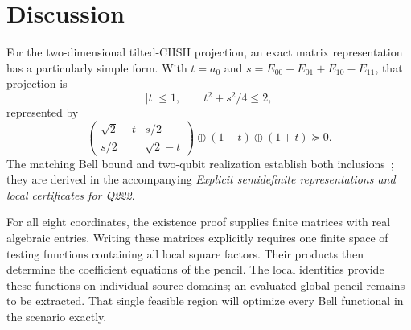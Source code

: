 \documentclass[11pt,a4paper]{article}
\theoremstyle{definition}
\begin{document}

\section{Discussion}

For the two-dimensional tilted-CHSH projection, an exact matrix
representation has a particularly simple form. With $t=a_0$ and
$s=E_{00}+E_{01}+E_{10}-E_{11}$, that projection is
\[
 |t|\le1,\qquad t^2+s^2/4\le2,
\]
represented by
\[
 \begin{pmatrix}\sqrt2+t&s/2\\s/2&\sqrt2-t\end{pmatrix}
 \oplus(1-t)\oplus(1+t)\succeq0.
\]
The matching Bell bound and two-qubit realization establish both
inclusions~\cite{BampsPironio}; they are derived in the accompanying
\emph{Explicit semidefinite representations and local certificates for Q222}.

For all eight coordinates, the existence proof supplies finite
matrices with real algebraic entries. Writing these matrices explicitly
requires one finite space of testing functions containing all local
square factors. Their products then determine the coefficient equations
of the pencil. The local identities provide these functions on individual
source domains; an evaluated global pencil remains to be extracted.
That single feasible region will optimize every Bell functional in the
scenario exactly.


\end{document}

